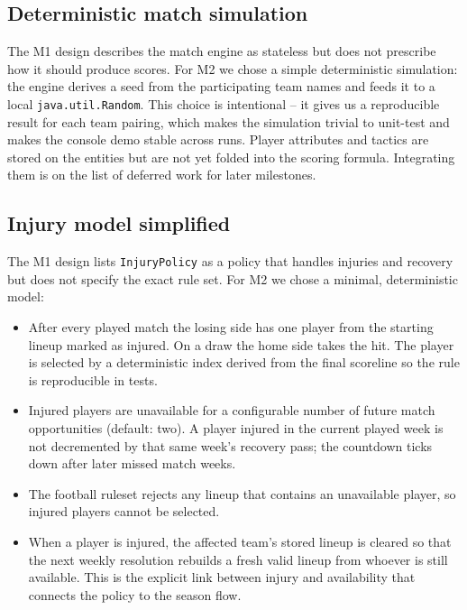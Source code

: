 \documentclass[11pt, a4paper]{article}
\newcommand{\code}[1]{\texttt{#1}}
\begin{document}
\subsection{Deterministic match simulation}

The M1 design describes the match engine as stateless but does not
prescribe how it should produce scores. For M2 we chose a simple
deterministic simulation: the engine derives a seed from the participating
team names and feeds it to a local \code{java.util.Random}. This choice is
intentional -- it gives us a reproducible result for each team pairing,
which makes the simulation trivial to unit-test and makes the console demo
stable across runs. Player attributes and tactics are stored on the entities
but are not yet folded into the scoring formula. Integrating them is on the
list of deferred work for later milestones.

\subsection{Injury model simplified}

The M1 design lists \code{InjuryPolicy} as a policy that handles injuries
and recovery but does not specify the exact rule set. For M2 we chose a
minimal, deterministic model:

\begin{itemize}
    \item After every played match the losing side has one player from the
          starting lineup marked as injured. On a draw the home side takes
          the hit. The player is selected by a deterministic index derived
          from the final scoreline so the rule is reproducible in tests.
    \item Injured players are unavailable for a configurable number of
          future match opportunities (default: two). A player injured in
          the current played week is not decremented by that same week's
          recovery pass; the countdown ticks down after later missed
          match weeks.
    \item The football ruleset rejects any lineup that contains an
          unavailable player, so injured players cannot be selected.
    \item When a player is injured, the affected team's stored lineup is
          cleared so that the next weekly resolution rebuilds a fresh
          valid lineup from whoever is still available. This is the
          explicit link between injury and availability that connects the
          policy to the season flow.
\end{itemize}
\end{document}
